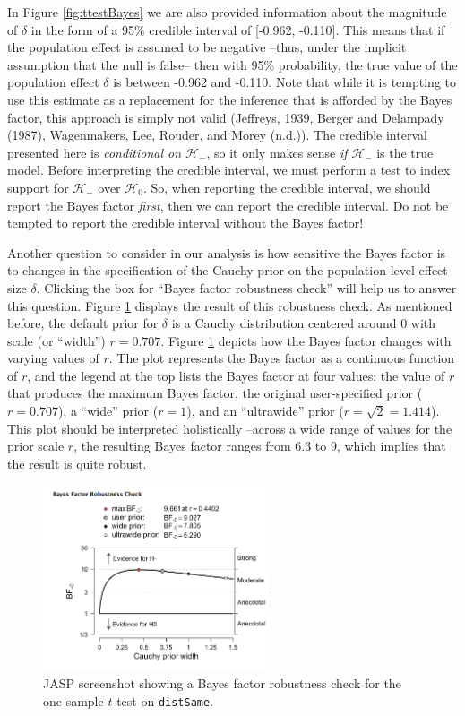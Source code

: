 \documentclass[english,,doc,floatsintext]{apa6}
\begin{document}
In Figure \ref{fig:ttestBayes} we are also provided information about the magnitude of \(\delta\) in the form of a 95\% credible interval of {[}-0.962, -0.110{]}. This means that if the population effect is assumed to be negative --thus, under the implicit assumption that the null is false-- then with 95\% probability, the true value of the population effect \(\delta\) is between -0.962 and -0.110. Note that while it is tempting to use this estimate as a replacement for the inference that is afforded by the Bayes factor, this approach is simply not valid (Jeffreys, 1939, Berger and Delampady (1987), Wagenmakers, Lee, Rouder, and Morey (n.d.)). The credible interval presented here is \emph{conditional on \(\mathcal{H}_{-}\)}, so it only makes sense \emph{if} \(\mathcal{H}_{-}\) is the true model. Before interpreting the credible interval, we must perform a test to index support for \(\mathcal{H}_{-}\) over \(\mathcal{H}_{0}\). So, when reporting the credible interval, we should report the Bayes factor \emph{first}, then we can report the credible interval. Do not be tempted to report the credible interval without the Bayes factor!

Another question to consider in our analysis is how sensitive the Bayes factor is to changes in the specification of the Cauchy prior on the population-level effect size \(\delta\). Clicking the box for \enquote{Bayes factor robustness check} will help us to answer this question. Figure \ref{fig:ttestRobust} displays the result of this robustness check. As mentioned before, the default prior for \(\delta\) is a Cauchy distribution centered around \(0\) with scale (or \enquote{width}) \(r=0.707\). Figure \ref{fig:ttestRobust} depicts how the Bayes factor changes with varying values of \(r\). The plot represents the Bayes factor as a continuous function of \(r\), and the legend at the top lists the Bayes factor at four values: the value of \(r\) that produces the maximum Bayes factor, the original user-specified prior (\(r=0.707\)), a \enquote{wide} prior (\(r=1\)), and an \enquote{ultrawide} prior (\(r=\sqrt{2}=1.414\)). This plot should be interpreted holistically --across a wide range of values for the prior scale \(r\), the resulting Bayes factor ranges from 6.3 to 9, which implies that the result is quite robust.

\begin{figure}
\centering
\includegraphics[width=0.6\textwidth,height=\textheight]{figures/ttestRobust.png}
\caption{\label{fig:ttestRobust}JASP screenshot showing a Bayes factor robustness check for the one-sample \(t\)-test on \texttt{distSame}.}
\end{figure}
\end{document}
